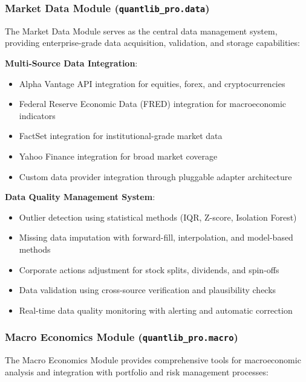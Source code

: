 \documentclass[12pt,a4paper]{article}
\theoremstyle{definition}
\theoremstyle{remark}
\begin{document}
\subsubsection{Market Data Module (\texttt{quantlib\_pro.data})}

The Market Data Module serves as the central data management system, providing enterprise-grade data acquisition, validation, and storage capabilities:

\textbf{Multi-Source Data Integration}:
\begin{itemize}
    \item Alpha Vantage API integration for equities, forex, and cryptocurrencies
    \item Federal Reserve Economic Data (FRED) integration for macroeconomic indicators
    \item FactSet integration for institutional-grade market data
    \item Yahoo Finance integration for broad market coverage
    \item Custom data provider integration through pluggable adapter architecture
\end{itemize}

\textbf{Data Quality Management System}:
\begin{itemize}
    \item Outlier detection using statistical methods (IQR, Z-score, Isolation Forest)
    \item Missing data imputation with forward-fill, interpolation, and model-based methods
    \item Corporate actions adjustment for stock splits, dividends, and spin-offs
    \item Data validation using cross-source verification and plausibility checks
    \item Real-time data quality monitoring with alerting and automatic correction
\end{itemize}

\subsubsection{Macro Economics Module (\texttt{quantlib\_pro.macro})}

The Macro Economics Module provides comprehensive tools for macroeconomic analysis and integration with portfolio and risk management processes:
\end{document}
